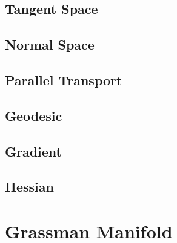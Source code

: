 \documentclass[11pt,a4paper]{report}
\begin{document}
\section{Tangent Space}
\section{Normal Space}
\section{Parallel Transport}
\section{Geodesic}
\section{Gradient}
\section{Hessian}
\chapter{Grassman Manifold}
\end{document}
